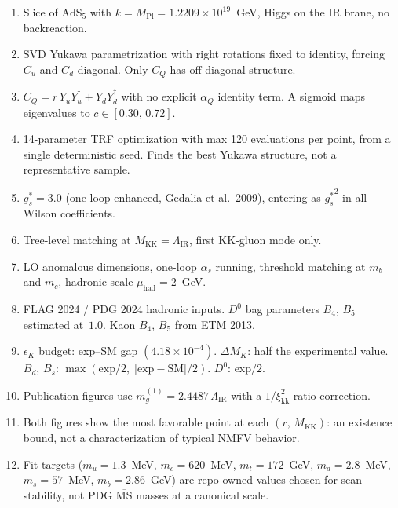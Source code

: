\documentclass[11pt]{article}
\newcommand{\Mkk}{M_{\mathrm{KK}}}
\newcommand{\LamIR}{\Lambda_{\mathrm{IR}}}
\newcommand{\Mpl}{M_{\mathrm{Pl}}}
\newcommand{\gs}{g_s^*}
\begin{document}
\begin{enumerate}
  \item Slice of $\mathrm{AdS}_5$ with
    $k = \Mpl = 1.2209\times10^{19}$~GeV, Higgs on the IR brane, no
    backreaction.

  \item SVD Yukawa parametrization with right rotations fixed to identity,
    forcing $C_u$ and $C_d$ diagonal. Only $C_Q$ has off-diagonal structure.

  \item $C_Q = r\,Y_u Y_u^\dagger + Y_d Y_d^\dagger$ with no explicit
    $\alpha_Q$ identity term. A sigmoid maps eigenvalues to
    $c \in [0.30,\,0.72]$.

  \item 14-parameter TRF optimization with max 120 evaluations per point, from
    a single deterministic seed. Finds the best Yukawa structure, not a
    representative sample.

  \item $\gs = 3.0$ (one-loop enhanced, Gedalia et al.\ 2009), entering as
    ${\gs}^2$ in all Wilson coefficients.

  \item Tree-level matching at $\Mkk = \LamIR$, first KK-gluon mode only.

  \item LO anomalous dimensions, one-loop $\alpha_s$ running, threshold
    matching at $m_b$ and $m_c$, hadronic scale $\mu_{\mathrm{had}} = 2$~GeV.

  \item FLAG 2024 / PDG 2024 hadronic inputs. $D^0$ bag parameters $B_4$,
    $B_5$ estimated at~$1.0$. Kaon $B_4$, $B_5$ from ETM 2013.

  \item $\epsilon_K$ budget: exp--SM gap $(4.18\times10^{-4})$. $\Delta M_K$:
    half the experimental value. $B_d$, $B_s$:
    $\max(\text{exp}/2,\;|\text{exp}-\text{SM}|/2)$. $D^0$: exp$/2$.

  \item Publication figures use
    $m_g^{(1)} = 2.4487\,\LamIR$ with a $1/\xi_{\mathrm{kk}}^2$ ratio
    correction.

  \item Both figures show the most favorable point at each $(r,\,\Mkk)$:
    an existence bound, not a characterization of typical NMFV behavior.

  \item Fit targets
    ($m_u = 1.3$~MeV, $m_c = 620$~MeV, $m_t = 172$~GeV, $m_d = 2.8$~MeV,
    $m_s = 57$~MeV, $m_b = 2.86$~GeV) are repo-owned values chosen for scan
    stability, not PDG $\overline{\mathrm{MS}}$ masses at a canonical scale.
\end{enumerate}
\end{document}
